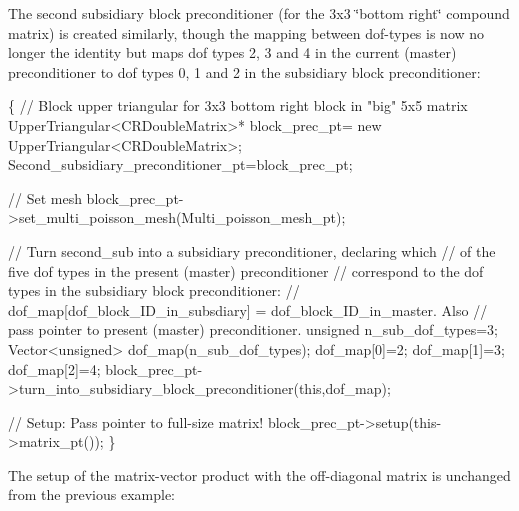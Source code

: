 The second subsidiary block preconditioner (for the 3x3 \char`\"{}bottom right\char`\"{} compound matrix) is created similarly, though the mapping between dof-\/types is now no longer the identity but maps dof types 2, 3 and 4 in the current (master) preconditioner to dof types 0, 1 and 2 in the subsidiary block preconditioner\+: 
\begin{DoxyCodeInclude}

  \{
   \textcolor{comment}{// Block upper triangular for 3x3 bottom right block in "big" 5x5 matrix}
   UpperTriangular<CRDoubleMatrix>* block\_prec\_pt=
    \textcolor{keyword}{new} UpperTriangular<CRDoubleMatrix>;
   Second\_subsidiary\_preconditioner\_pt=block\_prec\_pt;
   
   \textcolor{comment}{// Set mesh}
   block\_prec\_pt->set\_multi\_poisson\_mesh(Multi\_poisson\_mesh\_pt);
   
   \textcolor{comment}{// Turn second\_sub into a subsidiary preconditioner, declaring which}
   \textcolor{comment}{// of the five dof types in the present (master) preconditioner}
   \textcolor{comment}{// correspond to the dof types in the subsidiary block preconditioner:}
   \textcolor{comment}{// dof\_map[dof\_block\_ID\_in\_subsdiary] = dof\_block\_ID\_in\_master. Also }
   \textcolor{comment}{// pass pointer to present (master) preconditioner.}
   \textcolor{keywordtype}{unsigned} n\_sub\_dof\_types=3;
   Vector<unsigned> dof\_map(n\_sub\_dof\_types);
   dof\_map[0]=2;
   dof\_map[1]=3;
   dof\_map[2]=4;
   block\_prec\_pt->turn\_into\_subsidiary\_block\_preconditioner(\textcolor{keyword}{this},dof\_map);    

   \textcolor{comment}{// Setup: Pass pointer to full-size matrix!}
   block\_prec\_pt->setup(this->matrix\_pt());
  \}

\end{DoxyCodeInclude}


The setup of the matrix-\/vector product with the off-\/diagonal matrix is unchanged from the previous example\+:


